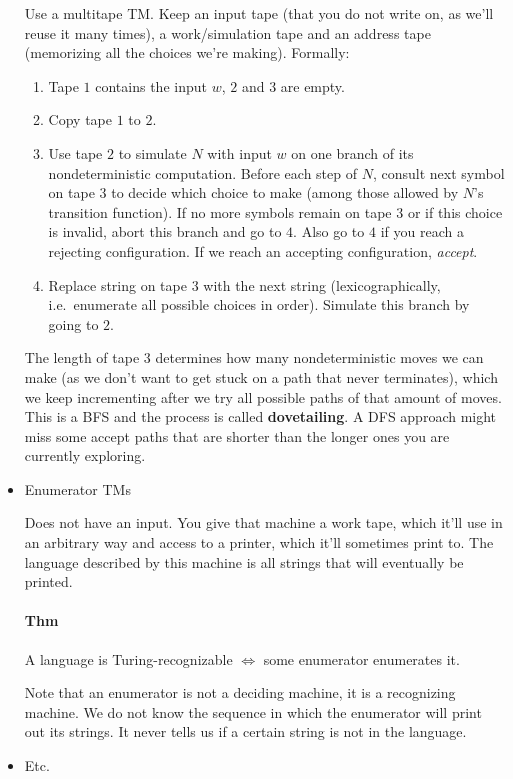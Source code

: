 \documentclass[12 pt]{article}
\begin{document}
\begin{itemize}
  Use a multitape TM. Keep an input tape (that you do not write on, as
  we'll reuse it many times), a work/simulation tape and an address
  tape (memorizing all the choices we're making). Formally:
  \begin{enumerate}
  \item Tape $1$ contains the input $w$, $2$ and $3$ are empty.
  \item Copy tape $1$ to $2$.
  \item Use tape $2$ to simulate $N$ with input $w$ on one branch of
    its nondeterministic computation. Before each step of $N$, consult
    next symbol on tape $3$ to decide which choice to make (among
    those allowed by $N$'s transition function). If no more symbols
    remain on tape $3$ or if this choice is invalid, abort this branch
    and go to $4$. Also go to $4$ if you reach a rejecting
    configuration. If we reach an accepting configuration,
    \textit{accept}.
  \item Replace string on tape $3$ with the next string
    (lexicographically, i.e.\ enumerate all possible choices in order). Simulate this branch by going to $2$.
  \end{enumerate}
  The length of tape $3$ determines how many nondeterministic moves we
  can make (as we don't want to get stuck on a path that never
  terminates), which we keep incrementing after we try all possible
  paths of that amount of moves. This is a BFS and the process is
  called \textbf{dovetailing}. A DFS approach might
  miss some accept paths that are shorter than the longer ones you are
  currently exploring.
\item Enumerator TMs

  Does not have an input. You give that machine a work tape, which
  it'll use in an arbitrary way and access to a printer, which it'll
  sometimes print to. The language described by this machine is all
  strings that will eventually be printed.

  \paragraph{Thm} A language is Turing-recognizable $\iff$ some
  enumerator enumerates it.

  Note that an enumerator is not a deciding machine, it is a
  recognizing machine. We do not know the sequence in which the
  enumerator will print out its strings. It never tells us if a
  certain string is not in the language.
\item Etc.
\end{itemize}
\end{document}
